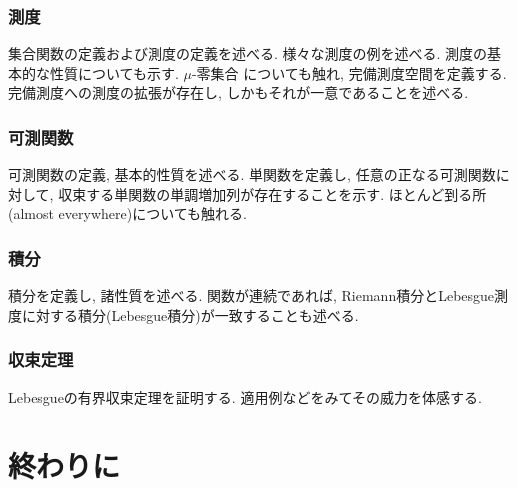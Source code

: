 \documentclass[a4j,dvipdfmx]{jsarticle}
\numberwithin{equation}{section}
\begin{document}
    \section{測度}
        集合関数の定義および測度の定義を述べる. 様々な測度の例を述べる. 測度の基本的な性質についても示す. $\mu$-零集合
        についても触れ, 完備測度空間を定義する. 完備測度への測度の拡張が存在し, しかもそれが一意であることを述べる.
    \clearpage
    \section{可測関数}
        可測関数の定義, 基本的性質を述べる. 単関数を定義し, 任意の正なる可測関数に対して, 収束する単関数の単調増加列が存在することを示す.
        ほとんど到る所(almost everywhere)についても触れる.
    \clearpage
    \section{積分}
        積分を定義し, 諸性質を述べる. 関数が連続であれば, Riemann積分とLebesgue測度に対する積分(Lebesgue積分)が一致することも述べる.
    \clearpage
    \section{収束定理}
        Lebesgueの有界収束定理を証明する. 適用例などをみてその威力を体感する.
    \clearpage
    \part{終わりに}
        \clearpage
    \printindex
\end{document}
